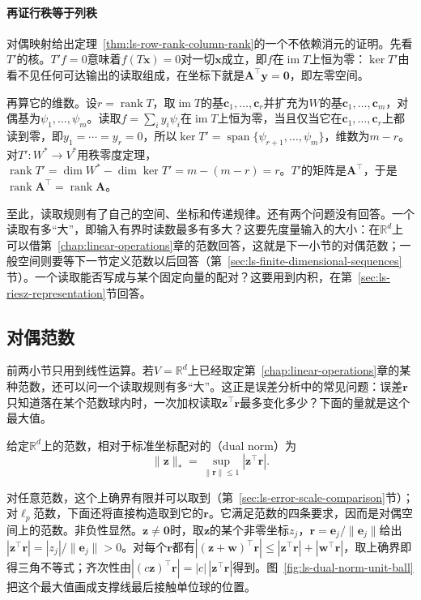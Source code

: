 \paragraph{再证行秩等于列秩}
对偶映射给出定理~\ref{thm:ls-row-rank-column-rank}的一个不依赖消元的证明。先看$T'$的核。$T'f=0$意味着$f(T\bm x)=0$对一切$\bm x$成立，即$f$在$\operatorname{im}T$上恒为零：$\ker T'$由看不见任何可达输出的读取组成，在坐标下就是$\bm A^\top\bm y=\bm0$，即左零空间。

再算它的维数。设$r=\operatorname{rank}T$，取$\operatorname{im}T$的基$\bm c_1,\ldots,\bm c_r$并扩充为$W$的基$\bm c_1,\ldots,\bm c_m$，对偶基为$\psi_1,\ldots,\psi_m$。读取$f=\sum_iy_i\psi_i$在$\operatorname{im}T$上恒为零，当且仅当它在$\bm c_1,\ldots,\bm c_r$上都读到零，即$y_1=\cdots=y_r=0$，所以$\ker T'=\operatorname{span}\{\psi_{r+1},\ldots,\psi_m\}$，维数为$m-r$。对$T':W^*\to V^*$用秩零度定理，$\operatorname{rank}T'=\dim W^*-\dim\ker T'=m-(m-r)=r$。$T'$的矩阵是$\bm A^\top$，于是$\operatorname{rank}\bm A^\top=\operatorname{rank}\bm A$。

至此，读取规则有了自己的空间、坐标和传递规律。还有两个问题没有回答。一个读取有多“大”，即输入有界时读数最多有多大？这要先度量输入的大小：在$\mathbb R^d$上可以借第~\ref{chap:linear-operations}章的范数回答，这就是下一小节的对偶范数；一般空间则要等下一节定义范数以后回答（第~\ref{sec:ls-finite-dimensional-sequences}节）。一个读取能否写成与某个固定向量的配对？这要用到内积，在第~\ref{sec:ls-riesz-representation}节回答。

\subsection{对偶范数}
\label{sec:ls-dual-norms}

前两小节只用到线性运算。若$V=\mathbb R^d$上已经取定第~\ref{chap:linear-operations}章的某种范数，还可以问一个读取规则有多“大”。这正是误差分析中的常见问题：误差$\bm r$只知道落在某个范数球内时，一次加权读取$\bm z^\top\bm r$最多变化多少？下面的量就是这个最大值。
\begin{definition}[对偶范数]
\label{def:linear-algebra-dual-norm}
给定$\mathbb R^d$上的范数，相对于标准坐标配对的（dual norm）为
\begin{equation}
 \lVert\bm z\rVert_*=\sup_{\lVert\bm r\rVert\leq1}|\bm z^\top\bm r|.
 \label{eq:linear-algebra-dual-norm-definition}
\end{equation}
\end{definition}
对任意范数，这个上确界有限并可以取到（第~\ref{sec:ls-error-scale-comparison}节）；对$\ell_p$范数，下面还将直接构造取到它的$\bm r$。它满足范数的四条要求，因而是对偶空间上的范数。非负性显然。$\bm z\neq\bm0$时，取$\bm z$的某个非零坐标$z_j$，$\bm r=\bm e_j/\lVert\bm e_j\rVert$给出$|\bm z^\top\bm r|=|z_j|/\lVert\bm e_j\rVert>0$。对每个$\bm r$都有$|(\bm z+\bm w)^\top\bm r|\leq|\bm z^\top\bm r|+|\bm w^\top\bm r|$，取上确界即得三角不等式；齐次性由$|(c\bm z)^\top\bm r|=|c|\,|\bm z^\top\bm r|$得到。图~\ref{fig:ls-dual-norm-unit-ball}把这个最大值画成支撑线最后接触单位球的位置。


